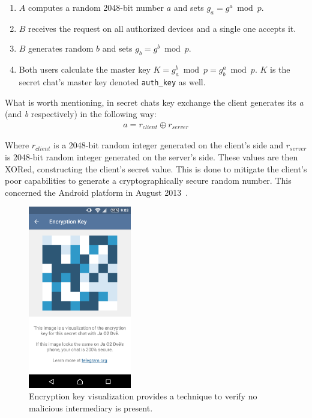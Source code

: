 \documentclass[thesis=M,english]{FITthesis}[2012/10/20]
\begin{document}
\begin{enumerate}
	\item $A$ computes a random 2048-bit number $a$ and sets $g_a = g^a \bmod p$.\label{enum:DH-a}
	\item $B$ receives the request on all authorized devices and a single one accepts it.
	\item $B$ generates random $b$ and sets $g_b = g^b \bmod p$\label{enum:DH-b}.
	\item Both users calculate the master key $K = g_a^b \bmod p = g_b^a \bmod p$. $K$ is the secret chat's master key denoted \texttt{auth\_key} as well.
\end{enumerate}

What is worth mentioning, in secret chats key exchange the client generates its \emph{a} (and \emph{b} respectively) in the following way:
\begin{gather*}
a = r_{client} \oplus r_{server}
\end{gather*}

Where $r_{client}$ is a 2048-bit random integer generated on the client's side and $r_{server}$ is 2048-bit random integer generated on the server's side. These values are then XORed, constructing the client's secret value. This is done to mitigate the client's poor capabilities to generate a cryptographically secure random number. This concerned the Android platform in August 2013~\cite{telegram-android-securerandom}.

\begin{figure}[htb]
	\centering
	\includegraphics[width=0.4\textwidth]{telegram-keybox.png}
	\caption[Encryption key visualization]{Encryption key visualization provides a technique to verify no malicious intermediary is present.}
	\label{img:telegram-keybox}
\end{figure}
\end{document}
